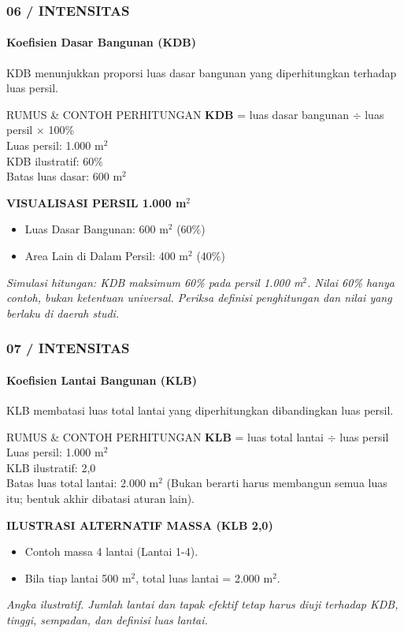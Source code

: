 \documentclass[../main.tex]{subfiles}
\begin{document}
\begin{frame}[mytitle=standard,t,mycolor=digiPH_gray!20]
	\frametitle{06 / INTENSITAS}
	\framesubtitle{Koefisien Dasar Bangunan (KDB)}

	KDB menunjukkan proporsi luas dasar bangunan yang diperhitungkan terhadap luas persil.

	\begin{block}{RUMUS \& CONTOH PERHITUNGAN}
		\textbf{KDB} = luas dasar bangunan $\div$ luas persil $\times$ 100\%\\[0.5em]
		Luas persil: 1.000 m$^2$\\
		KDB ilustratif: 60\%\\
		Batas luas dasar: 600 m$^2$
	\end{block}

	\textbf{VISUALISASI PERSIL 1.000 m$^2$}
	\begin{itemize}
		\item Luas Dasar Bangunan: 600 m$^2$ (60\%)
		\item Area Lain di Dalam Persil: 400 m$^2$ (40\%)
	\end{itemize}

	\vfill
	\footnotesize\textit{Simulasi hitungan: KDB maksimum 60\% pada persil 1.000 m$^2$. Nilai 60\% hanya contoh, bukan ketentuan universal. Periksa definisi penghitungan dan nilai yang berlaku di daerah studi.}
\end{frame}

\begin{frame}[mytitle=imageplus,t]
	\frametitle{07 / INTENSITAS}
	\framesubtitle{Koefisien Lantai Bangunan (KLB)}

	KLB membatasi luas total lantai yang diperhitungkan dibandingkan luas persil.

	\begin{block}{RUMUS \& CONTOH PERHITUNGAN}
		\textbf{KLB} = luas total lantai $\div$ luas persil\\[0.5em]
		Luas persil: 1.000 m$^2$\\
		KLB ilustratif: 2,0\\
		Batas luas total lantai: 2.000 m$^2$ (Bukan berarti harus membangun semua luas itu; bentuk akhir dibatasi aturan lain).
	\end{block}

	\textbf{ILUSTRASI ALTERNATIF MASSA (KLB 2,0)}
	\begin{itemize}
		\item Contoh massa 4 lantai (Lantai 1-4).
		\item Bila tiap lantai 500 m$^2$, total luas lantai = 2.000 m$^2$.
	\end{itemize}

	\vfill
	\footnotesize\textit{Angka ilustratif. Jumlah lantai dan tapak efektif tetap harus diuji terhadap KDB, tinggi, sempadan, dan definisi luas lantai.}
\end{frame}
\end{document}
